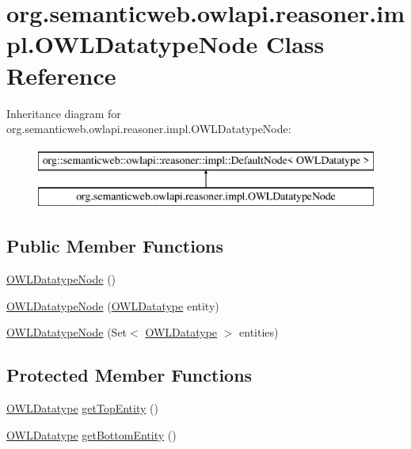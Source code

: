 \hypertarget{classorg_1_1semanticweb_1_1owlapi_1_1reasoner_1_1impl_1_1_o_w_l_datatype_node}{\section{org.\-semanticweb.\-owlapi.\-reasoner.\-impl.\-O\-W\-L\-Datatype\-Node Class Reference}
\label{classorg_1_1semanticweb_1_1owlapi_1_1reasoner_1_1impl_1_1_o_w_l_datatype_node}
}
Inheritance diagram for org.\-semanticweb.\-owlapi.\-reasoner.\-impl.\-O\-W\-L\-Datatype\-Node\-:\begin{figure}[H]
\begin{center}
\leavevmode
\includegraphics[height=2.000000cm]{classorg_1_1semanticweb_1_1owlapi_1_1reasoner_1_1impl_1_1_o_w_l_datatype_node}
\end{center}
\end{figure}
\subsection*{Public Member Functions}
\begin{DoxyCompactItemize}
\item 
\hyperlink{classorg_1_1semanticweb_1_1owlapi_1_1reasoner_1_1impl_1_1_o_w_l_datatype_node_aa0d3e1044fd0b23ae061397ebe833944}{O\-W\-L\-Datatype\-Node} ()
\item 
\hyperlink{classorg_1_1semanticweb_1_1owlapi_1_1reasoner_1_1impl_1_1_o_w_l_datatype_node_a9bb52f22b05e8f668a80498f7c884f39}{O\-W\-L\-Datatype\-Node} (\hyperlink{interfaceorg_1_1semanticweb_1_1owlapi_1_1model_1_1_o_w_l_datatype}{O\-W\-L\-Datatype} entity)
\item 
\hyperlink{classorg_1_1semanticweb_1_1owlapi_1_1reasoner_1_1impl_1_1_o_w_l_datatype_node_aa596c1726407cd07538fc1af0c4ef6b6}{O\-W\-L\-Datatype\-Node} (Set$<$ \hyperlink{interfaceorg_1_1semanticweb_1_1owlapi_1_1model_1_1_o_w_l_datatype}{O\-W\-L\-Datatype} $>$ entities)
\end{DoxyCompactItemize}
\subsection*{Protected Member Functions}
\begin{DoxyCompactItemize}
\item 
\hyperlink{interfaceorg_1_1semanticweb_1_1owlapi_1_1model_1_1_o_w_l_datatype}{O\-W\-L\-Datatype} \hyperlink{classorg_1_1semanticweb_1_1owlapi_1_1reasoner_1_1impl_1_1_o_w_l_datatype_node_a7259594da4d3d9b37a3c09f0a34ceec2}{get\-Top\-Entity} ()
\item 
\hyperlink{interfaceorg_1_1semanticweb_1_1owlapi_1_1model_1_1_o_w_l_datatype}{O\-W\-L\-Datatype} \hyperlink{classorg_1_1semanticweb_1_1owlapi_1_1reasoner_1_1impl_1_1_o_w_l_datatype_node_a1d7325049a21d1940848be42d5eb16b2}{get\-Bottom\-Entity} ()
\end{DoxyCompactItemize}


